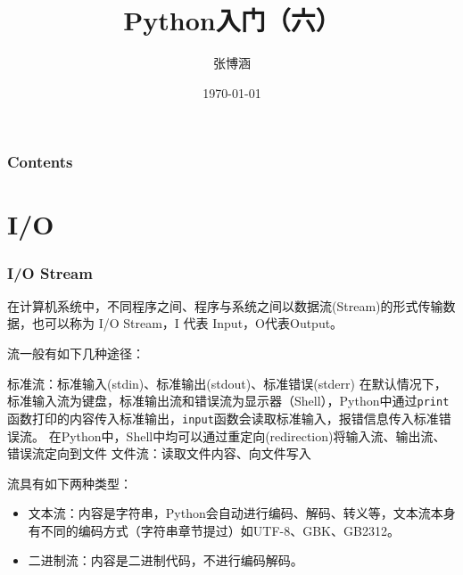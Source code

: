 \documentclass[9pt]{beamer}
\title{Python入门（六）}
\author{张博涵}
\institute{北京航空航天大学}
\date{\today}
\begin{document}
\begin{frame}[plain]
\maketitle
\end{frame}


\begin{frame}
    \frametitle{Contents}

    \tableofcontents

\end{frame}

\section{I/O}
\begin{frame}
    \frametitle{I/O Stream}

    在计算机系统中，不同程序之间、程序与系统之间以数据流(Stream)的形式传输数据，也可以称为 I/O Stream，I 代表 Input，O代表Output。

    \vspace{5mm}

    流一般有如下几种途径：

    \begin{outline}
        \1 标准流：标准输入(stdin)、标准输出(stdout)、标准错误(stderr)
        \2 在默认情况下，标准输入流为键盘，标准输出流和错误流为显示器（Shell），Python中通过\texttt{print}函数打印的内容传入标准输出，\texttt{input}函数会读取标准输入，报错信息传入标准错误流。
        \2 在Python中，Shell中均可以通过重定向(redirection)将输入流、输出流、错误流定向到文件
        \1 文件流：读取文件内容、向文件写入
    \end{outline}

    \vspace{5mm}

    流具有如下两种类型：

    \begin{itemize}
        \item 文本流：内容是字符串，Python会自动进行编码、解码、转义等，文本流本身有不同的编码方式（字符串章节提过）如UTF-8、GBK、GB2312。
        \item 二进制流：内容是二进制代码，不进行编码解码。
    \end{itemize}
\end{frame}
\end{document}
